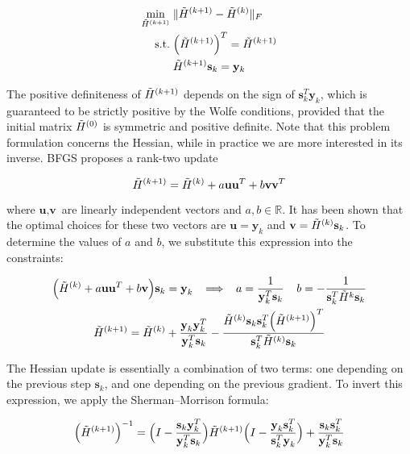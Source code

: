 \documentclass{article}
\numberwithin{equation}{subsection}
\begin{document}
\begin{align}
    \min_{\Tilde{H}^{(k+1)}} \;& \Vert \Tilde{H}^{(k+1)} - \Tilde{H}^{(k)} \Vert_F \\
    \text{s.t.} \;& \Big( \Tilde{H}^{(k+1)} \Big)^T = \Tilde{H}^{(k+1)} \notag \\
                 & \Tilde{H}^{(k+1)} \mathbf{s}_k = \mathbf{y}_k \notag
\end{align}

The positive definiteness of $\Tilde{H}^{(k+1)}$ depends on the sign of $\textbf{s}_k^T \textbf{y}_k$, which is guaranteed to be strictly positive by the Wolfe conditions, provided that the initial matrix $\Tilde{H}^{(0)}$ is symmetric and positive definite. Note that this problem formulation concerns the Hessian, while in practice we are more interested in its inverse. BFGS proposes a rank-two update

\begin{equation*}
    \Tilde{H}^{(k+1)} = \Tilde{H}^{(k)} + a \textbf{u}\textbf{u}^T + b \textbf{v} \textbf{v}^T
\end{equation*}

where $\textbf{u},\textbf{v}$ are linearly independent vectors and $a,b \in \mathbb{R}$. It has been shown that the optimal choices for these two vectors are $\textbf{u} = \textbf{y}_k$ and $\textbf{v} = \Tilde{H}^{(k)} \textbf{s}_k$. To determine the values of $a$ and $b$, we substitute this expression into the constraints:

\begin{gather*}
    \Big(\Tilde{H}^{(k)} + a \textbf{u}\textbf{u}^T + b \textbf{v}\Big) \textbf{s}_k = \textbf{y}_k \;\; \implies \;\; a = \frac{1}{\textbf{y}_k^T \textbf{s}_k } \;\;\;\; b = -\frac{1}{\textbf{s}_k^T \Tilde{H}^k \textbf{s}_k} \\
    \Tilde{H}^{(k+1)} = \Tilde{H}^{(k)} + \frac{\textbf{y}_k \textbf{y}_k^T}{\textbf{y}_k^T \textbf{s}_k} - \frac{\Tilde{H}^{(k)}\textbf{s}_k \textbf{s}_k^T \Big(\Tilde{H}^{(k+1)}\Big)^T}{\textbf{s}_k^T \Tilde{H}^{(k)}\textbf{s}_k}
\end{gather*}

The Hessian update is essentially a combination of two terms: one depending on the previous step $\textbf{s}_k$, and one depending on the previous gradient. To invert this expression, we apply the Sherman–Morrison formula:

\begin{equation}
    \Big(\Tilde{H}^{(k+1)}\Big)^{-1} = \Big( I - \frac{\textbf{s}_k\textbf{y}_k^T}{\textbf{y}_k^T\textbf{s}_k} \Big) \Tilde{H}^{(k+1)} \Big( I - \frac{\textbf{y}_k \textbf{s}_k^T}{\textbf{s}_k^T \textbf{y}_k} \Big) + \frac{\textbf{s}_k \textbf{s}_k^T}{\textbf{y}_k^T \textbf{s}_k}
\end{equation}
\end{document}
